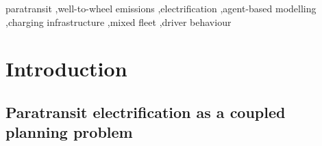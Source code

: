 \documentclass{elsarticle}
\begin{document}
\begin{frontmatter}
\begin{abstract}
    Under the replay design, 23\% to 57\% of vehicle-days strand. In the agent-based base case none strand, but the EVs carry 7\% to 26\% fewer passengers than as ICE vehicles. The agent-based model adds 400~kW in Khayelitsha and pools the same power at one hub in Bellville and Wynberg; the replay designs keep 3.5 to 11.9 points fewer EV passengers. ICE competitors take 85\% to 98\% of these passengers without driving further. With zero-carbon electricity, the EVs would avoid almost all of their diesel well-to-wheel CO$_2$ in the agent-based model, but only 22\% to 71\% in the replay model. On South Africa's 2023 grid, an electric kilometre emits 9\% more than a diesel one, and the avoided CO$_2$ ranges from $-23$\% to 14\%.

    Replay may therefore miss the design that keeps the most passengers on the EVs and understate the benefit of cleaner electricity, which matters more than where the chargers go. Agent-based modelling captures these effects requiring significant computation, with behavioural and demand assumptions.
\end{abstract}

% 

\begin{keyword}
    paratransit \sep well-to-wheel emissions \sep electrification \sep agent-based modelling \sep charging infrastructure \sep mixed fleet \sep driver behaviour
\end{keyword}

\end{frontmatter}


\section{Introduction}
\subsection{Paratransit electrification as a coupled planning problem}

\end{document}
